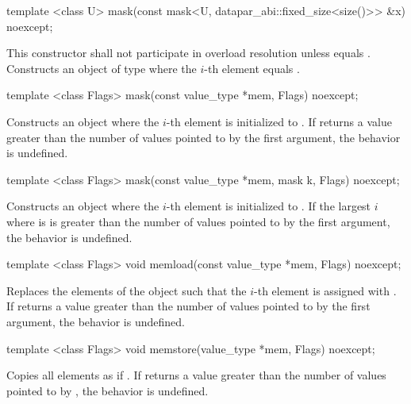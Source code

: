 \begin{itemdecl}
template <class U> mask(const mask<U, datapar_abi::fixed_size<size()>> &x) noexcept;
\end{itemdecl}
\begin{itemdescr}
  \pnum\remarks This constructor shall not participate in overload resolution unless
     equals \fixedsizescoped{}.
  \pnum\effects Constructs an object of type \mask where the $i$-th element equals  \foralli.
\end{itemdescr}

\begin{itemdecl}
template <class Flags> mask(const value_type *mem, Flags) noexcept;
\end{itemdecl}
\begin{itemdescr}
  \pnum\effects Constructs an object where the $i$-th element is initialized to  \foralli.
  \pnum\remarks If  returns a value greater than the number of values pointed to by the first argument, the behavior is undefined.
  \flagsRemarks{\mask{}}
\end{itemdescr}

\begin{itemdecl}
template <class Flags> mask(const value_type *mem, mask k, Flags) noexcept;
\end{itemdecl}
\begin{itemdescr}
  \pnum\effects Constructs an object where the $i$-th element is initialized to  \foralli.
  \pnum\remarks If the largest $i$ where  is \true is greater than the number of values pointed to by the first argument, the behavior is undefined.
  \flagsRemarks{\mask{}}
\end{itemdescr}

\begin{itemdecl}
template <class Flags> void memload(const value_type *mem, Flags) noexcept;
\end{itemdecl}
\begin{itemdescr}
  \pnum\effects Replaces the elements of the \mask object such that the $i$-th element is assigned with  \foralli.
  \pnum\remarks If  returns a value greater than the number of values pointed to by the first argument, the behavior is undefined.
  \flagsRemarks{\mask{}}
\end{itemdescr}

\begin{itemdecl}
template <class Flags> void memstore(value_type *mem, Flags) noexcept;
\end{itemdecl}
\begin{itemdescr}
  \pnum\effects Copies all \mask elements as if  \foralli.
  \pnum\remarks If  returns a value greater than the number of values pointed to by , the behavior is undefined.
  \flagsRemarks{\mask{}}
\end{itemdescr}

